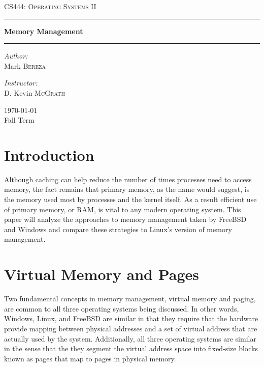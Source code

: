 \documentclass[onecolumn, draftclsnofoot,10pt, compsoc]{IEEEtran}
\begin{document}
\begin{titlepage}
\begin{center}

\vspace*{50mm}

\textsc{\LARGE CS444: Operating Systems II}\\[1.5cm]

\hrule
\vspace{5mm}
{ \huge \bfseries Memory Management \\[0.9cm] }
\hrule 
\vspace{5mm}

\noindent
\begin{minipage}{0.4\textwidth}

\begin{flushleft} \large
\emph{Author:}\\
Mark \textsc{Bereza}
\end{flushleft}
\end{minipage}%
\begin{minipage}{0.4\textwidth}
\begin{flushright} \large
\emph{Instructor:} \\
D. Kevin \textsc{McGrath}
\end{flushright}

\end{minipage}

\vspace*{\fill}
{\large \today}\\
{\large Fall Term}

\end{center}
\end{titlepage}
  
\tableofcontents
\newpage
\renewcommand{\baselinestretch}{1.0}
\linespread{1.0}
\section{Introduction}
Although caching can help reduce the number of times processes need to access memory, the fact remains that primary memory, as the name would suggest, is the memory used most by processes and the kernel itself. As a result efficient use of primary memory, or RAM, is vital to any modern operating system. This paper will analyze the approaches to memory management taken by FreeBSD and Windows and compare these strategies to Linux's version of memory management.

\section{Virtual Memory and Pages}
Two fundamental concepts in memory management, virtual memory and paging, are common to all three operating systems being discussed. In other words, Windows, Linux, and FreeBSD are similar in that they require that the hardware provide mapping between physical addresses and a set of virtual address that are actually used by the system. Additionally, all three operating systems are similar in the sense that the they segment the virtual address space into fixed-size blocks known as pages that map to pages in physical memory. 
\end{document}

